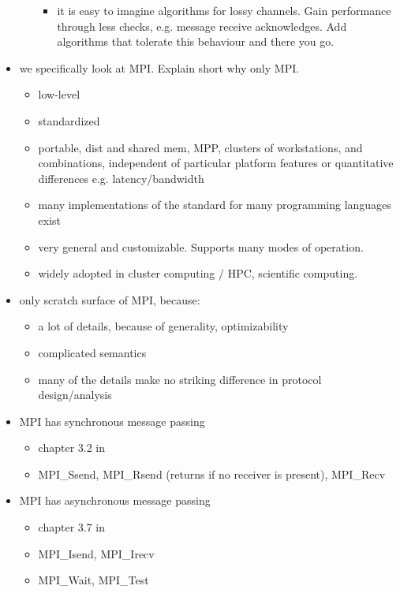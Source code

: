 \documentclass[a4paper, 10pt]{article}
\begin{document}
\begin{itemize}
\begin{itemize}
\begin{itemize}
					\item it is easy to imagine algorithms for lossy channels. Gain performance through less checks, e.g. message receive acknowledges. Add algorithms that tolerate this behaviour and there you go.
				\end{itemize}
		\end{itemize}
	\label{why-only-mpi}
	\item we specifically look at MPI\cite{mpi}. Explain short why only MPI.
		\begin{itemize}
			\item low-level
			\item standardized
			\item portable, dist and shared mem, MPP, clusters of workstations, and combinations, independent of particular platform features or quantitative differences e.g. latency/bandwidth
			\item many implementations of the standard for many programming languages exist
			\item very general and customizable. Supports many modes of operation.
			\item widely adopted in cluster computing / HPC, scientific computing.~\cite{mpiadoptiona}\cite{mpiadoptionb}\cite{mpiadoptionc}
		\end{itemize}
	\item only scratch surface of MPI, because:
		\begin{itemize}
			\item a lot of details, because of generality, optimizability
			\item complicated semantics
			\item many of the details make no striking difference in protocol design/analysis
		\end{itemize}
	\item MPI has synchronous message passing
		\begin{itemize}
			\item chapter 3.2 in \cite{mpi3}
			\item MPI\_Ssend, MPI\_Rsend (returns if no receiver is present), MPI\_Recv
		\end{itemize}
	\item MPI has asynchronous message passing
		\begin{itemize}
			\item chapter 3.7 in \cite{mpi3}
			\item MPI\_Isend, MPI\_Irecv
			\item MPI\_Wait, MPI\_Test

\end{itemize}
\end{itemize}
\end{document}
